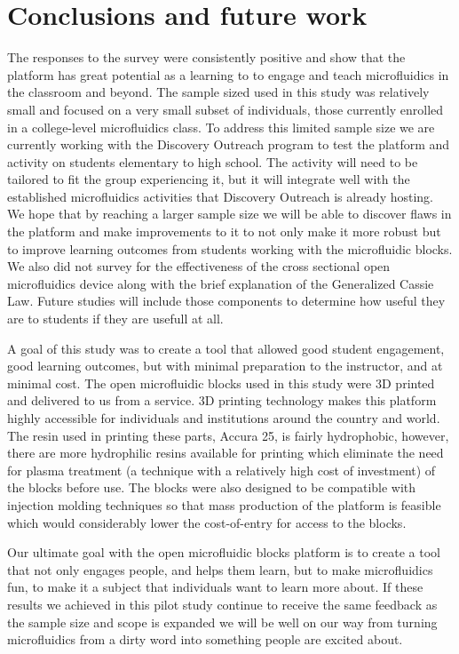 \section{Conclusions and future work}
The responses to the survey were consistently positive and show that the platform has great potential as a learning to to engage and teach microfluidics in the classroom and beyond. The sample sized used in this study was relatively small and focused on a very small subset of individuals, those currently enrolled in a college-level microfluidics class. To address this limited sample size we are currently working with the Discovery Outreach program to test the platform and activity on students elementary to high school. The activity will need to be tailored to fit the group experiencing it, but it will integrate well with the established microfluidics activities that Discovery Outreach is already hosting. We hope that by reaching a larger sample size we will be able to discover flaws in the platform and make improvements to it to not only make it more robust but to improve learning outcomes from students working with the microfluidic blocks. We also did not survey for the effectiveness of the cross sectional open microfluidics device along with the brief explanation of the Generalized Cassie Law. Future studies will include those components to determine how useful they are to students if they are usefull at all.

A goal of this study was to create a tool that allowed good student engagement, good learning outcomes, but with minimal preparation to the instructor, and at minimal cost. The open microfluidic blocks used in this study were 3D printed and delivered to us from a service. 3D printing technology makes this platform highly accessible for individuals and institutions around the country and world. The resin used in printing these parts, Accura 25, is fairly hydrophobic, however, there are more hydrophilic resins available for printing which eliminate the need for plasma treatment (a technique with a relatively high cost of investment) of the blocks before use. The blocks were also designed to be compatible with injection molding techniques so that mass production of the platform is feasible which would considerably lower the cost-of-entry for access to the blocks. 

Our ultimate goal with the open microfluidic blocks platform is to create a tool that not only engages people, and helps them learn, but to make microfluidics fun, to make it a subject that individuals want to learn more about. If these results we achieved in this pilot study continue to receive the same feedback as the sample size and scope is expanded we will be well on our way from turning microfluidics from a dirty word into something people are excited about.


